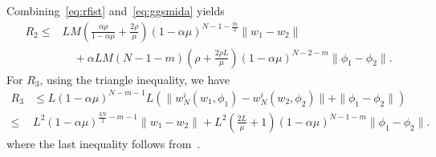 \documentclass{osudissert96}
\begin{document}
Combining~\cref{eq:rfist} and~\cref{eq:ggsmida} yields
\begin{align}\label{eq:r2bb}
R_2\leq& LM \left( \frac{\alpha\rho}{1-\alpha\mu}+\frac{2\rho}{\mu}\right)(1-\alpha\mu)^{N-1-\frac{m}{2}}\|w_1-w_2\|  \nonumber
\\&\quad+\alpha LM(N-1-m)\left( \rho+\frac{2\rho L}{\mu} \right)(1-\alpha\mu)^{N-2-m}\|\phi_1-\phi_2\|.
\end{align}
For $R_3$, using the triangle inequality, we have 
\begin{align}\label{eq:r3bb}
R_3&\leq L(1-\alpha \mu)^{N-m-1} L(\|w_N^i(w_1,\phi_1)-w_N^i(w_2,\phi_2)\|+\|\phi_1-\phi_2\|) \nonumber
\\\leq& L^2(1-\alpha\mu)^{\frac{3N}{2}-m-1}\|w_1-w_2\| + L^2\left(\frac{2L}{\mu}+1\right)(1-\alpha\mu)^{N-1-m}\|\phi_1-\phi_2\|.
\end{align}
where the last inequality follows from~.
\end{document}
